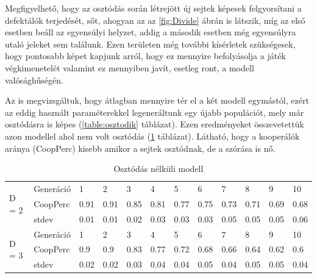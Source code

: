 Megfigyelhető, hogy az osztódás során létrejött új sejtek képesek felgyorsítani a defektálók terjedését, sőt, ahogyan az az \ref{fig:Divide} ábrán is látszik, míg az első esetben beáll az egyensúlyi helyzet, addig a második esetben még egyensúlyra utaló jeleket sem találunk. Ezen területen még további kísérletek szükségesek, hogy pontosabb képet kapjunk arról, hogy ez mennyire befolyásolja a játék végkimenetelét valamint ez mennyiben javít, esetleg ront, a modell valósághűségén.

Az is megvizsgáltuk, hogy átlagban mennyire tér el a két modell egymástól, ezért az eddig használt paraméterekkel legeneráltunk egy újabb populációt, mely már osztódásra is képes (\ref{table:osztodik} táblázat). Ezen eredményeket összevetettük azon modellel ahol nem volt osztódás (\ref{table:nemOsztodik} táblázat). Látható, hogy a kooperálók aránya (CoopPerc) kisebb amikor a sejtek osztódnak, de a szórása is nő.

\begin{table}[htb]
	\centering
	\begin{tabular}{ | l | l | l | l | l | l | l | l | l | l | l | l | }
		\hline
		\multirow{3}{*}{D = 2}
		& Generáció & 1 & 2 & 3 & 4 & 5 & 6 & 7 & 8 & 9 & 10 \\ \cline{2-12}
		& CoopPerc & 0.91 & 0.91 & 0.85 & 0.81 & 0.77 & 0.75 & 0.73 & 0.71 & 0.69 & 0.68 \\ \cline{2-12}
		& stdev & 0.01 & 0.01 & 0.02 & 0.03 & 0.03 & 0.03 & 0.05 & 0.05 & 0.05 & 0.06 \\ \hline
		\multirow{3}{*}{D = 3}
		& Generáció & 1 & 2 & 3 & 4 & 5 & 6 & 7 & 8 & 9 & 10 \\ \cline{2-12}
		& CoopPerc & 0.9 & 0.9 & 0.83 & 0.77 & 0.72 & 0.68 & 0.66 & 0.64 & 0.62 & 0.6 \\ \cline{2-12}
		& stdev & 0.02 & 0.02 & 0.03 & 0.04 & 0.04 & 0.05 & 0.04 & 0.05 & 0.05 & 0.04 \\ \hline
	\end{tabular}
	\vspace*{1mm}
	\caption{Osztódás nélküli modell}
	\label{table:nemOsztodik}
\end{table}


